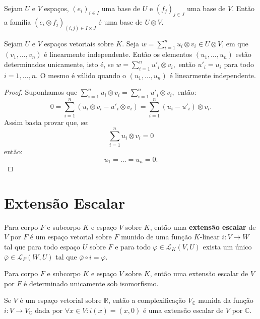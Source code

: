 \documentclass[11pt,twoside,a4paper]{book}
\begin{document}
\begin{teorema}
Sejam $U$ e $V$ espaços, $(e_i)_{i\in I}$ uma base de $U$ e $(f_j)_{j\in J}$ uma base de $V.$ Então a família $(e_i\otimes f_j)_{(i,j)\in I\times J}$ é uma base de $U\otimes V.$
\end{teorema}

\begin{proposicao}
Sejam $U$ e $V$ espaços vetoriais sobre $K.$ Seja $w=\sum_{i=1}^n u_i\otimes v_i\in U\otimes V$, em que $(v_1,\dots,v_n)$ é linearmente independente. Então os elementos $(u_1,\dots,u_n)$ estão determinados unicamente, isto é, se $w=\sum_{i=1}^nu'_i\otimes v_i,$ então $u'_i=u_i$ para todo $i=1,\dots,n.$ O mesmo é válido quando o $(u_1,\dots,u_n)$ é linearmente independente.
\end{proposicao}
\begin{proof}
Suponhamos que $\sum_{i=1}^nu_i\otimes v_i=\sum_{i=1}^nu'_i\otimes v_i,$ então:
\[
0=\sum_{i=1}^n\left(u_i\otimes v_i-u'_i\otimes v_i\right)=\sum_{i=1}^n(u_i-u'_i)\otimes v_i.
\]
Assim basta provar que, se:
\[
\sum_{i=1}^nu_i\otimes v_i=0
\]
então:
\[
u_1=\dots=u_n=0.
\]
\end{proof}

\section{Extensão Escalar}

\begin{definicao}
Para corpo $F$ e subcorpo $K$ e espaço $V$ sobre $K$, então uma \textbf{extensão escalar} de $V$ por $F$ é um espaço vetorial sobre $F$ munido de uma função $K$-linear $i:V\rightarrow W$ tal que para todo espaço $U$ sobre $F$ e para todo $\varphi\in\mathcal{L}_K(V,U)$ exista um único $\overline{\varphi}\in\mathcal{L}_F(W,U)$ tal que $\overline{\varphi}\circ i=\varphi.$
\end{definicao}

\begin{proposicao}
Para corpo $F$ e subcorpo $K$ e espaço $V$ sobre $K$, então uma extensão escalar de $V$ por $F$ é determinado unicamente sob isomorfismo.
\end{proposicao}

\begin{proposicao}
Se $V$ é um espaço vetorial sobre $\mathbb{R}$, então a complexificação $V_\mathbb{C}$ munida da função $i:V\rightarrow V_\mathbb{C}$ dada por $\forall x\in V:i(x)=(x,0)$ é uma extensão escalar de $V$ por $\mathbb{C}.$
\end{proposicao}
\end{document}
